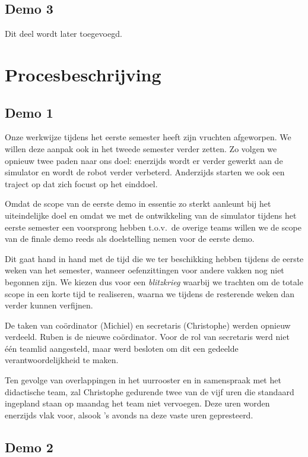 \documentclass[12pt,a4paper]{report}
\begin{document}
\section{Demo 3}

Dit deel wordt later toegevoegd.

\chapter{Procesbeschrijving}
\label{ch:process}

\section{Demo 1}

Onze werkwijze tijdens het eerste semester heeft zijn vruchten afgeworpen. We willen deze aanpak ook in het tweede semester verder zetten. Zo volgen we opnieuw twee paden naar ons doel: enerzijds wordt er verder gewerkt aan de simulator en wordt de robot verder verbeterd. Anderzijds starten we ook een traject op dat zich focust op het einddoel.

Omdat de scope van de eerste demo in essentie zo sterkt aanleunt bij het uiteindelijke doel en omdat we met de ontwikkeling van de simulator tijdens het eerste semester een voorsprong hebben t.o.v.\ de overige teams willen we de scope van de finale demo reeds als doelstelling nemen voor de eerste demo.

Dit gaat hand in hand met de tijd die we ter beschikking hebben tijdens de eerste weken van het semester, wanneer oefenzittingen voor andere vakken nog niet begonnen zijn. We kiezen dus voor een \emph{blitzkrieg} waarbij we trachten om de totale scope in een korte tijd te realiseren, waarna we tijdens de resterende weken dan verder kunnen verfijnen.

De taken van co\"ordinator (Michiel) en secretaris (Christophe) werden opnieuw verdeeld. Ruben is de nieuwe co\"ordinator. Voor de rol van secretaris werd niet \'e\'en teamlid aangesteld, maar werd besloten om dit een gedeelde verantwoordelijkheid te maken.

Ten gevolge van overlappingen in het uurrooster en in samenspraak met het didactische team, zal Christophe gedurende twee van de vijf uren die standaard ingepland staan op maandag het team niet vervoegen. Deze uren worden enerzijds vlak voor, alsook 's avonds na deze vaste uren gepresteerd.

\section{Demo 2}
\end{document}
